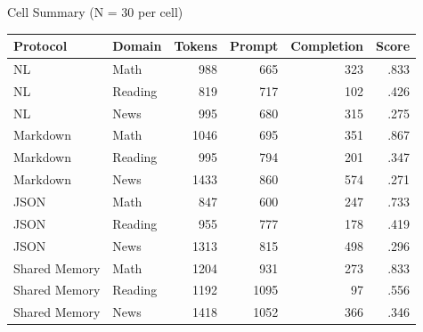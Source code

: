 \documentclass[aspectratio=169,10pt]{beamer}
\newcommand{\sectionlabeltext}{}
\newcommand{\setsectionlabel}[1]{\gdef\sectionlabeltext{\textls[120]{#1}}}
\begin{document}
\setsectionlabel{APPENDIX}
\begin{frame}{Cell Summary (N = 30 per cell)}
  \renewcommand{\arraystretch}{0.98}
  \begin{center}
  {\fontsize{10}{12}\selectfont
  \begin{tabular}{llrrrr}
    \rowcolor{textdark}
    \color{bgcream}Protocol & \color{bgcream}Domain & \color{bgcream}Tokens & \color{bgcream}Prompt & \color{bgcream}Completion & \color{bgcream}Score \\
    \hline
    \rowcolor{white} NL & Math & 988 & 665 & 323 & .833 \\
    \rowcolor{bgcream!60} NL & Reading & 819 & 717 & 102 & .426 \\
    \rowcolor{white} NL & News & 995 & 680 & 315 & .275 \\
    \rowcolor{bgcream!60} Markdown & Math & 1046 & 695 & 351 & .867 \\
    \rowcolor{white} Markdown & Reading & 995 & 794 & 201 & .347 \\
    \rowcolor{bgcream!60} Markdown & News & 1433 & 860 & 574 & .271 \\
    \rowcolor{white} JSON & Math & 847 & 600 & 247 & .733 \\
    \rowcolor{bgcream!60} JSON & Reading & 955 & 777 & 178 & .419 \\
    \rowcolor{white} JSON & News & 1313 & 815 & 498 & .296 \\
    \rowcolor{bgcream!60} Shared Memory & Math & 1204 & 931 & 273 & .833 \\
    \rowcolor{white} Shared Memory & Reading & 1192 & 1095 & 97 & .556 \\
    \rowcolor{bgcream!60} Shared Memory & News & 1418 & 1052 & 366 & .346 \\
  \end{tabular}}
  \end{center}
\end{frame}
\end{document}
